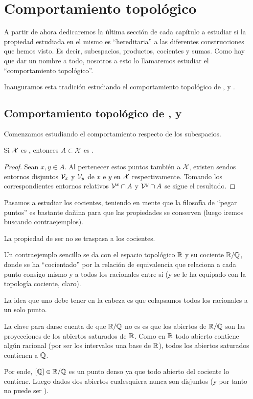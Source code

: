 \section{Comportamiento topológico} 
A partir de ahora dedicaremos la última sección de cada capítulo a estudiar si la propiedad estudiada en el mismo es ``hereditaria'' a las diferentes construcciones que hemos visto. Es decir, subespacios, productos, cocientes y sumas. Como hay que dar un nombre a todo, nosotros a esto lo llamaremos estudiar el ``comportamiento topológico''.

Inauguramos esta tradición estudiando el comportamiento topológico de \hausdorff, \frechet y \kolmogorov.
\subsection{Comportamiento topológico de \hausdorff, \frechet y \kolmogorov}
Comenzamos estudiando el comportamiento respecto de los subespacios.
\begin{lem}[Subespacios]
	Si $\mathcal{X}$ es \hausdorff, entonces $A\subset\mathcal{X}$ es \hausdorff.
\end{lem}
\begin{proof}
	 Sean $x,y\in A$. Al pertenecer estos puntos también a $\mathcal{X}$, existen sendos entornos disjuntos $\mathcal{V}_x$ y $\mathcal{V}_y$ de $x$ e $y$ en $\mathcal{X}$ respectivamente. Tomando los correspondientes entornos relativos $\mathcal{V}^x \cap A$ y $\mathcal{V}^y \cap A$ se sigue el resultado.
\end{proof}
Pasamos a estudiar los cocientes, teniendo en mente que la filosofía de ``pegar puntos'' es bastante dañina para que las propiedades se conserven (luego iremos buscando contraejemplos).
\begin{obs}[Cocientes]
	La propiedad de ser \hausdorff no se traspasa a los cocientes.
	
	Un contraejemplo sencillo se da con el espacio topológico $\mathbb{R}$ y su cociente $\mathbb{R}/\mathbb{Q}$, donde se ha ``cocientado'' por la relación de equivalencia que relaciona a cada punto consigo mismo y a todos los racionales entre sí (y se le ha equipado con la topología cociente, claro).
	
	La idea que uno debe tener en la cabeza es que colapsamos todos los racionales a un solo punto.
	
	La clave para darse cuenta de que $\mathbb{R}/\mathbb{Q}$ no es \hausdorff es que los abiertos de $\mathbb{R}/\mathbb{Q}$ son las proyecciones de los abiertos saturados de $\mathbb{R}$. Como en $\mathbb{R}$ todo abierto contiene algún racional (por ser los intervalos una base de $\mathbb{R}$), todos los abiertos saturados contienen a $\mathbb{Q}$.
	
	Por ende, $\left [ \mathbb{Q} \right ]\in\mathbb{R}/\mathbb{Q}$ es un punto denso ya que todo abierto del cociente lo contiene. Luego dados dos abiertos cualesquiera nunca son disjuntos (y por tanto no puede ser \hausdorff).
\end{obs}
